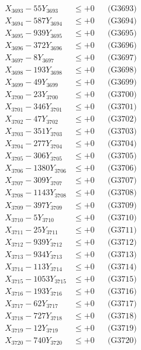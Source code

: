 \documentclass[a4paper,10pt]{article}
\begin{document}
{\begin{align}
X_{3693} - 55Y_{3693} &\leq +0 && \text{(G3693)} \\
X_{3694} - 587Y_{3694} &\leq +0 && \text{(G3694)} \\
X_{3695} - 939Y_{3695} &\leq +0 && \text{(G3695)} \\
X_{3696} - 372Y_{3696} &\leq +0 && \text{(G3696)} \\
X_{3697} - 8Y_{3697} &\leq +0 && \text{(G3697)} \\
X_{3698} - 193Y_{3698} &\leq +0 && \text{(G3698)} \\
X_{3699} - 49Y_{3699} &\leq +0 && \text{(G3699)} \\
X_{3700} - 23Y_{3700} &\leq +0 && \text{(G3700)} \\
\allowbreak
X_{3701} - 346Y_{3701} &\leq +0 && \text{(G3701)} \\
X_{3702} - 47Y_{3702} &\leq +0 && \text{(G3702)} \\
X_{3703} - 351Y_{3703} &\leq +0 && \text{(G3703)} \\
X_{3704} - 277Y_{3704} &\leq +0 && \text{(G3704)} \\
X_{3705} - 306Y_{3705} &\leq +0 && \text{(G3705)} \\
X_{3706} - 1380Y_{3706} &\leq +0 && \text{(G3706)} \\
X_{3707} - 309Y_{3707} &\leq +0 && \text{(G3707)} \\
X_{3708} - 1143Y_{3708} &\leq +0 && \text{(G3708)} \\
X_{3709} - 397Y_{3709} &\leq +0 && \text{(G3709)} \\
X_{3710} - 5Y_{3710} &\leq +0 && \text{(G3710)} \\
\allowbreak
X_{3711} - 25Y_{3711} &\leq +0 && \text{(G3711)} \\
X_{3712} - 939Y_{3712} &\leq +0 && \text{(G3712)} \\
X_{3713} - 934Y_{3713} &\leq +0 && \text{(G3713)} \\
X_{3714} - 113Y_{3714} &\leq +0 && \text{(G3714)} \\
X_{3715} - 1053Y_{3715} &\leq +0 && \text{(G3715)} \\
X_{3716} - 193Y_{3716} &\leq +0 && \text{(G3716)} \\
X_{3717} - 62Y_{3717} &\leq +0 && \text{(G3717)} \\
X_{3718} - 727Y_{3718} &\leq +0 && \text{(G3718)} \\
X_{3719} - 12Y_{3719} &\leq +0 && \text{(G3719)} \\
X_{3720} - 740Y_{3720} &\leq +0 && \text{(G3720)} \\

\end{align}}
\end{document}
